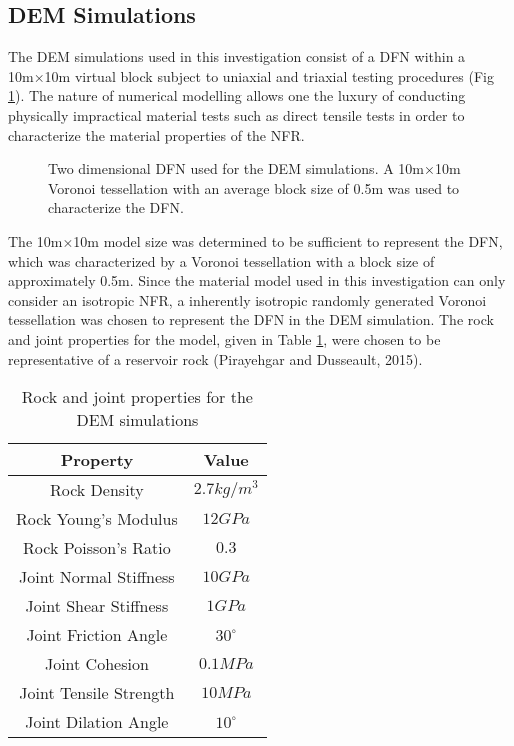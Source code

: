 \subsection{DEM Simulations}
The DEM simulations used in this investigation consist of a DFN within a 10m×10m virtual block subject to uniaxial and triaxial testing procedures (Fig \ref{fig:vorDFN}). The nature of numerical modelling allows one the luxury of conducting physically impractical material tests such as direct tensile tests in order to characterize the material properties of the NFR.

\begin{figure}[!htbp]
	\label{fig:vorDFN}
	\caption{Two dimensional DFN used for the DEM simulations. A 10m×10m Voronoi tessellation with an average block size of 0.5m was used to characterize the DFN.}
\end{figure}

The 10m×10m model size was determined to be sufficient to represent the DFN, which was characterized by a Voronoi tessellation with a block size of approximately 0.5m. Since the material model used in this investigation can only consider an isotropic NFR, a inherently isotropic randomly generated Voronoi tessellation was chosen to represent the DFN in the DEM simulation. The rock and joint properties for the model, given in Table \ref{tab:demProp}, were chosen to be representative of a reservoir rock (Pirayehgar and Dusseault, 2015).

\begin{table}%
	\centering
	\label{tab:demProp}
	\caption{Rock and joint properties for the DEM simulations}
	\begin{tabular}{c c}
		\toprule
		Property & Value\\
		\midrule
		Rock Density & $2.7 kg/m^3$\\
		Rock Young's Modulus & $12 GPa$\\
		Rock Poisson's Ratio & $0.3$\\
		Joint Normal Stiffness & $10 GPa$\\
		Joint Shear Stiffness & $1 GPa$\\
		Joint Friction Angle & $30^\circ$\\
		Joint Cohesion & $0.1 MPa$\\
		Joint Tensile Strength & $10 MPa$\\
		Joint Dilation Angle & $10^\circ$\\
		\bottomrule
	\end{tabular}
\end{table}

